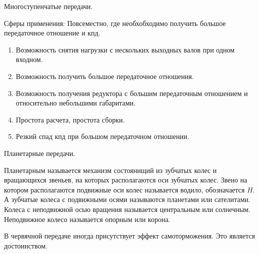 \documentclass{article}
\begin{document}
Многоступенчатые передачи.

Сферы применения:
Повсеместно, где необхобходимо получить большое передаточное отношение и кпд.

\begin{enumerate}
	\item Возможность снятия нагрузки с нескольких выходных валов при одном входном.
	\item Возможность получить большое передаточное отношения.
	\item Возможность получения редуктора с большим передаточным отношением и относительно небольшими габаритами.
	\item Простота расчета, простота сборки.
	\item Резкий спад кпд при большом передаточном отношении.
\end{enumerate}

Планетарные передачи.

Планетарным называется механизм состоянищий из зубчатых колес и вращающихся звеньев, на которых располагаются оси зубчатых колес.
Звено на котором располагаются подвижные оси колес называется водило, обозначается $H$. А зубчатые колеса с подвижными осями называются планетами или сателитами.
Колеса с неподвижной осью вращения называется центральным или солнечным. Неподвижное колесо называется опорным или корона.

В червячной передаче иногда присутствует эффект самоторможения.
Это является достоинством.
\end{document}
